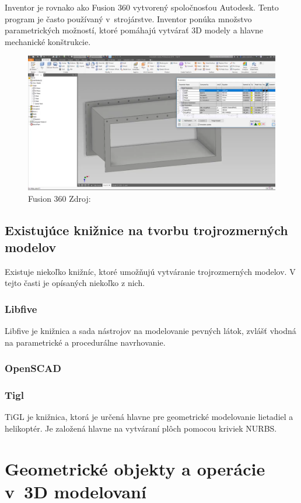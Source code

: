 Inventor je rovnako ako Fusion 360 vytvorený spoločnosťou Autodesk. Tento program je často používaný v~strojárstve. Inventor ponúka množstvo parametrických možností, ktoré pomáhajú vytvárať 3D modely a hlavne mechanické konštrukcie.


\begin{figure}[H]
    \centering
    \includegraphics[width = 0.5\linewidth]{obrazky-figures/programs/Inventor.png}
    \caption{Fusion 360 Zdroj: \cite{cadline_2017} }
    \label{fig:Inventor}
\end{figure}

\section{Existujúce knižnice na tvorbu trojrozmerných  modelov} \label{sec:existing_libraries}
Existuje niekoľko knižníc, ktoré umožňujú vytváranie trojrozmerných modelov. V tejto časti je opísaných niekoľko z nich.
\subsection*{Libfive}
Libfive je knižnica  a sada nástrojov na modelovanie pevných látok, zvlášť vhodná na parametrické a procedurálne navrhovanie.

\subsection*{OpenSCAD}

\subsection*{Tigl}
TiGL je knižnica, ktorá je určená hlavne pre geometrické modelovanie lietadiel a helikoptér. Je založená hlavne na vytváraní plôch pomocou kriviek NURBS.


\chapter{Geometrické objekty a operácie v~3D modelovaní}
\label{chapt:Geometrické_tvary}

